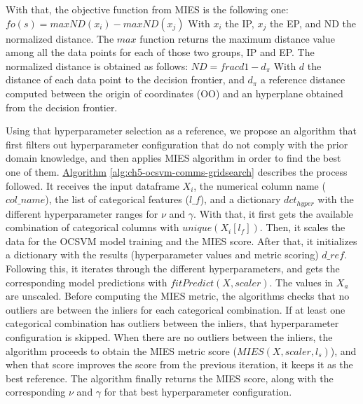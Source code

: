 With that, the objective function from MIES is the following one:
$fo(s) = max ND(x_i) - max ND(x_j)$
With $x_i$ the IP, $x_j$ the EP, and ND the normalized distance. The $max$ function returns the maximum distance value among all the data points for each of those two groups, IP and EP. 
The normalized distance is obtained as follows:
$ND = frac{d}{1 - d_{\pi}}$ 
With $d$ the distance of each data point to the decision frontier, and $d_{\pi}$ a reference distance computed between the origin of coordinates (OO) and an hyperplane obtained from the decision frontier.

Using that hyperparameter selection as a reference, we propose an algorithm that first filters out hyperparameter configuration that do not comply with the prior domain knowledge, and then applies MIES algorithm in order to find the best one of them. \hyperref[alg:ch5-ocsvm-comms-gridsearch]{Algorithm} \ref{alg:ch5-ocsvm-comms-gridsearch} describes the process followed. It receives the input dataframe $X_i$, the numerical column name ($col\_name$), the list of categorical features ($l\_f$), and a dictionary $dct_{hyper}$ with the different hyperparameter ranges for $\nu$ and $\gamma$. With that, it first gets the available combination of categorical columns with $unique(X_i[l_f])$. Then, it scales the data for the OCSVM model training and the MIES score. After that, it initializes a dictionary with the results (hyperparameter values and metric scoring) $d\_ref$. Following this, it iterates through the different hyperparameters, and gets the corresponding model predictions with $fitPredict(X, scaler)$. The values in $X_a$ are unscaled. Before computing the MIES metric, the algorithms checks that no outliers are between the inliers for each categorical combination. If at least one categorical combination has outliers between the inliers, that hyperparameter configuration is skipped. When there are no outliers between the inliers, the algorithm proceeds to obtain the MIES metric score ($MIES(X, scaler, l_s)$), and when that score improves the score from the previous iteration, it keeps it as the best reference. 
The algorithm finally returns the MIES score, along with the corresponding $\nu$ and $\gamma$ for that best hyperparameter configuration.

